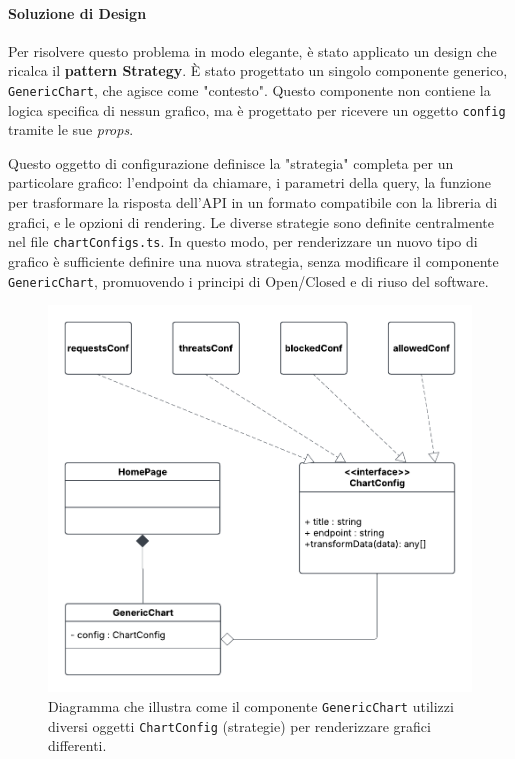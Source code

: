 \documentclass[12pt,a4paper,openright,twoside]{book}
\begin{document}
\paragraph{Soluzione di Design}
Per risolvere questo problema in modo elegante, è stato applicato un design che ricalca il \textbf{pattern Strategy}. È stato progettato un singolo componente generico, \texttt{GenericChart}, che agisce come "contesto". Questo componente non contiene la logica specifica di nessun grafico, ma è progettato per ricevere un oggetto \texttt{config} tramite le sue \textit{props}.

Questo oggetto di configurazione definisce la "strategia" completa per un particolare grafico: l'endpoint da chiamare, i parametri della query, la funzione per trasformare la risposta dell'API in un formato compatibile con la libreria di grafici, e le opzioni di rendering. Le diverse strategie sono definite centralmente nel file \texttt{chartConfigs.ts}. In questo modo, per renderizzare un nuovo tipo di grafico è sufficiente definire una nuova strategia, senza modificare il componente \texttt{GenericChart}, promuovendo i principi di Open/Closed e di riuso del software.

\vspace{1cm}
\begin{figure}[h!]
    \centering
    \includegraphics[width=\textwidth]{figures/strategy.pdf}
    \caption{Diagramma che illustra come il componente \texttt{GenericChart} utilizzi diversi oggetti \texttt{ChartConfig} (strategie) per renderizzare grafici differenti.}
    \label{fig:strategy_frontend_uml}
\end{figure}
\vspace{1cm}
\end{document}
